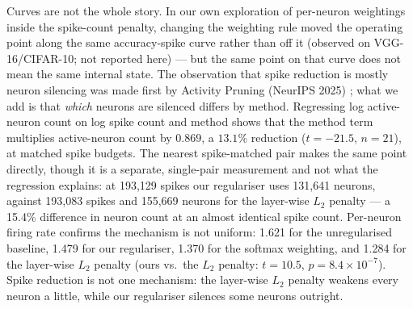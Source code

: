 Curves are not the whole story. In our own exploration of per-neuron weightings inside
the spike-count penalty, changing the weighting rule moved the operating point along the
same accuracy-spike curve rather than off it (observed on VGG-16/CIFAR-10; not reported
here) --- but the same point on that curve does not mean the same internal state. The observation that
spike reduction is mostly neuron silencing was made first by Activity Pruning
(NeurIPS 2025) \cite{bu2025activity}; what we add is that \emph{which} neurons are
silenced differs by method. Regressing log active-neuron count on log spike count and
method shows that the method term multiplies active-neuron count by $0.869$, a $13.1\%$ reduction
($t=-21.5$, $n=21$), at matched spike budgets. The nearest spike-matched pair makes the
same point directly, though it is a separate, single-pair measurement and not what the
regression explains: at 193,129 spikes our regulariser uses 131,641 neurons, against
193,083 spikes and 155,669 neurons for the layer-wise $L_2$ penalty --- a 15.4\%
difference in neuron count at an almost identical spike count. Per-neuron firing rate
confirms the mechanism is not uniform: 1.621 for the unregularised baseline, 1.479 for
our regulariser, 1.370 for the softmax weighting, and 1.284 for the layer-wise $L_2$
penalty (ours vs.\ the $L_2$ penalty: $t=10.5$, $p=8.4{\times}10^{-7}$). Spike reduction
is not one mechanism: the layer-wise $L_2$ penalty weakens every neuron a little, while
our regulariser silences some neurons outright.



